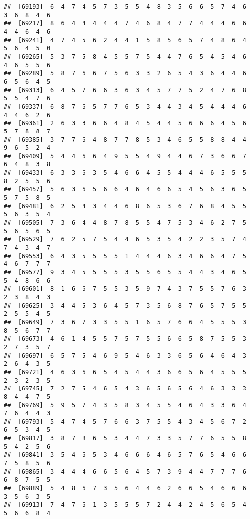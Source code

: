 \documentclass[
]{book}
\begin{document}
\begin{verbatim}
##  [69193]  6  4  7  4  5  7  3  5  5  4  8  3  5  6  6  5  7  4  6  3  6  8  4  6
##  [69217]  8  6  4  4  4  4  4  7  4  6  8  4  7  7  4  4  4  6  6  4  4  6  4  6
##  [69241]  4  7  4  5  6  2  4  4  1  5  8  5  6  5  7  4  8  6  4  5  6  4  5  0
##  [69265]  5  3  7  5  8  4  5  5  7  5  4  4  7  6  5  4  5  4  6  4  6  5  5  6
##  [69289]  5  8  7  6  6  7  5  6  3  3  2  6  5  4  3  6  4  4  6  6  5  6  4  5
##  [69313]  6  4  5  7  6  6  3  6  3  4  5  7  7  5  2  4  7  6  8  5  5  4  7  6
##  [69337]  6  8  7  6  5  7  7  6  5  3  4  4  3  4  5  4  4  4  6  4  4  6  2  6
##  [69361]  2  6  3  3  6  6  4  8  4  5  4  4  5  6  6  6  4  5  6  5  7  8  8  7
##  [69385]  3  7  7  6  4  8  7  7  8  5  3  4  6  5  5  8  8  4  4  9  6  5  2  4
##  [69409]  5  4  4  6  6  4  9  5  5  4  9  4  4  6  7  3  6  6  7  6  4  8  3  8
##  [69433]  6  3  3  6  3  5  4  6  6  4  5  5  4  4  4  6  5  5  5  8  2  5  5  6
##  [69457]  5  6  3  6  5  6  6  4  6  4  6  6  5  4  5  6  3  6  5  5  7  5  8  5
##  [69481]  6  2  5  4  3  4  4  6  8  6  5  3  6  7  6  8  4  5  5  5  6  3  5  4
##  [69505]  7  3  6  4  4  8  7  8  5  5  4  7  5  3  4  6  2  7  5  5  6  5  6  5
##  [69529]  7  6  2  5  7  5  4  4  6  5  3  5  4  2  2  3  5  7  4  7  4  3  4  7
##  [69553]  6  4  3  5  5  5  5  1  4  4  4  6  3  4  6  6  4  7  5  4  6  7  7  7
##  [69577]  9  3  4  5  5  5  5  3  5  5  6  5  5  4  4  3  4  6  5  5  4  8  6  6
##  [69601]  8  1  6  6  7  5  5  3  5  9  7  4  3  7  5  5  7  6  3  2  3  8  4  3
##  [69625]  3  4  4  5  3  6  4  5  7  3  5  6  8  7  6  5  7  5  5  2  5  5  4  5
##  [69649]  7  3  6  7  3  3  5  5  1  6  5  7  6  6  4  5  5  5  3  8  5  6  7  7
##  [69673]  4  6  1  4  5  5  7  5  7  5  5  6  6  5  8  7  5  5  3  2  7  3  5  7
##  [69697]  6  5  7  5  4  6  9  5  4  6  3  3  6  5  6  4  6  4  3  2  6  4  3  5
##  [69721]  4  6  3  6  6  5  4  5  4  4  3  6  6  5  6  4  5  5  5  2  3  2  3  5
##  [69745]  7  2  7  5  4  6  5  4  3  6  5  6  5  6  4  6  3  3  3  8  4  4  7  5
##  [69769]  5  9  5  7  4  3  5  8  3  4  5  5  4  6  4  3  3  6  4  7  6  4  4  3
##  [69793]  5  4  7  4  5  7  6  6  3  7  5  5  4  3  4  5  6  7  2  6  5  3  4  5
##  [69817]  3  8  7  8  6  5  3  4  4  7  3  3  5  7  7  6  5  5  8  5  4  2  5  6
##  [69841]  3  5  4  6  5  3  4  6  6  6  4  6  5  7  6  5  4  6  6  7  5  8  5  6
##  [69865]  3  4  4  4  6  6  5  6  4  5  7  3  9  4  4  7  7  7  6  6  8  7  5  5
##  [69889]  5  4  8  6  7  3  5  6  4  4  6  2  6  6  5  4  6  6  6  3  5  6  3  5
##  [69913]  7  4  7  6  1  3  5  5  5  7  2  4  4  2  4  5  6  5  4  5  6  6  8  4

\end{verbatim}
\end{document}
